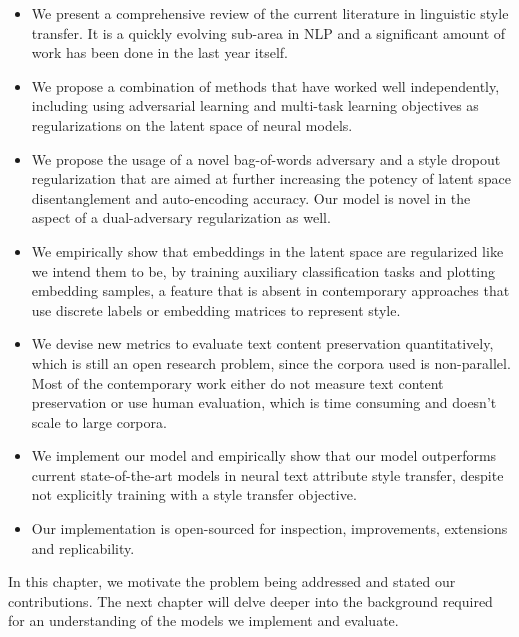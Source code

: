 \begin{itemize}
	\item We present a comprehensive review of the current literature in linguistic style transfer. It is a quickly evolving sub-area in NLP and a significant amount of work has been done in the last year itself.
	\item We propose a combination of methods that have worked well independently, including using adversarial learning and multi-task learning objectives as regularizations on the latent space of neural models.
	\item We propose the usage of a novel bag-of-words adversary and a style dropout regularization that are aimed at further increasing the potency of latent space disentanglement and auto-encoding accuracy. Our model is novel in the aspect of a dual-adversary regularization as well.
	\item We empirically show that embeddings in the latent space are regularized like we intend them to be, by training auxiliary classification tasks and plotting embedding samples, a feature that is absent in contemporary approaches that use discrete labels or embedding matrices to represent style.
	\item We devise new metrics to evaluate text content preservation quantitatively, which is still an open research problem, since the corpora used is non-parallel. Most of the contemporary work either do not measure text content preservation or use human evaluation, which is time consuming and doesn't scale to large corpora.
	\item We implement our model and empirically show that our model outperforms current state-of-the-art models in neural text attribute style transfer, despite not explicitly training with a style transfer objective.
	\item Our implementation is open-sourced for inspection, improvements, extensions and replicability.
\end{itemize}


In this chapter, we motivate the problem being addressed and stated our contributions. The next chapter will delve deeper into the background required for an understanding of the models we implement and evaluate.
